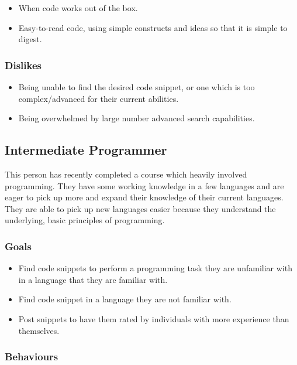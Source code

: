\documentclass[11pt,a4paper]{article}
\begin{document}
\begin{itemize}
\item When code works out of the box.
\item Easy-to-read code, using simple constructs and ideas so that it
is simple to digest.
\end{itemize}

\subsubsection{Dislikes}

\begin{itemize}
\item Being unable to find the desired code snippet, or one which is
too complex/advanced for their current abilities.
\item Being overwhelmed by large number advanced search capabilities.
\end{itemize}

\newpage

\subsection{Intermediate Programmer}

This person has recently completed a course which heavily involved programming.
They have some working knowledge in a few languages and are eager to pick up
more and expand their knowledge of their current languages. They are able to
pick up new languages easier because they understand the underlying, basic
principles of programming.

\subsubsection{Goals}

\begin{itemize}
\item Find code snippets to perform a programming task they are unfamiliar
with in a language that they are familiar with.
\item Find code snippet in a language they are not familiar with.
\item Post snippets to have them rated by individuals with more experience than
themselves.
\end{itemize}

\subsubsection{Behaviours}
\end{document}
